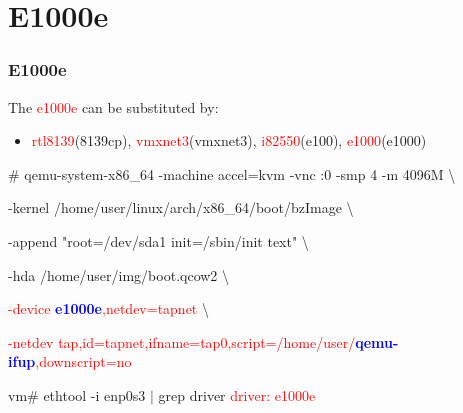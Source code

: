 \documentclass[aspectratio=169]{beamer}
\begin{document}

\section{E1000e}
\begin{frame}
\frametitle{E1000e}
The \textcolor{red}{e1000e} can be substituted by:
\begin{itemize}
\item \textcolor{red}{rtl8139}(8139cp), \textcolor{red}{vmxnet3}(vmxnet3), \textcolor{red}{i82550}(e100), \textcolor{red}{e1000}(e1000)
\end{itemize}
\begin{block}{}

\# qemu-system-x86\_64 -machine accel=kvm -vnc :0 -smp 4 -m 4096M \textbackslash

-kernel /home/user/linux/arch/x86\_64/boot/bzImage \textbackslash
	
-append "root=/dev/sda1 init=/sbin/init text" \textbackslash

-hda /home/user/img/boot.qcow2 \textbackslash

\textcolor{red}{-device \textbf{\textcolor{blue}{e1000e}},netdev=tapnet} \textbackslash

\textcolor{red}{-netdev tap,id=tapnet,ifname=tap0,script=/home/user/\textbf{\textcolor{blue}{qemu-ifup}},downscript=no}

\end{block}
\begin{block}{}
vm\# ethtool -i enp0s3 $|$ grep driver \newline
\textcolor{red}{driver: e1000e}
\end{block}
\end{frame}

\end{document}
